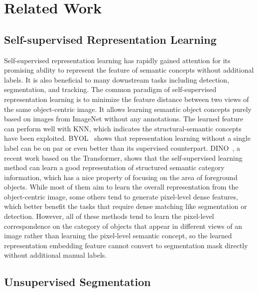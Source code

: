 \documentclass[runningheads]{llncs}
\begin{document}
\section{Related Work}
\label{sec:related_work}

\subsection{Self-supervised Representation Learning}
Self-supervised representation learning has rapidly gained attention for its promising ability to represent the feature of semantic concepts without additional labels. It is also beneficial to many downstream tasks including detection, segmentation, and tracking. The common paradigm of self-supervised representation learning is to minimize the feature distance between two views of the same object-centric image\cite{SwAV,SimSiam,SimCLR,BYOL,MoCoV1,MoCoV2,MoCoV3,EsViT,DINO}. It allows learning semantic object concepts purely based on images from ImageNet without any annotations. The learned feature can perform well with KNN, which indicates the structural-semantic concepts have been exploited. BYOL~\cite{BYOL} shows that representation learning without a single label can be on par or even better than its supervised counterpart. DINO~\cite{DINO}, a recent work based on the Transformer, shows that the self-supervised learning method can learn a good representation of structured semantic category information, which has a nice property of focusing on the area of foreground objects. While most of them aim to learn the overall representation from the object-centric image, some others\cite{DenceCL,PixPro,DSC,VADeR,SetSim,VFS} tend to generate pixel-level dense features, which better benefit the tasks that require dense matching like segmentation or detection. However, all of these methods tend to learn the pixel-level correspondence on the category of objects that appear in different views of an image rather than learning the pixel-level semantic concept, so the learned representation embedding feature cannot convert to segmentation mask directly without additional manual labels.



\subsection{Unsupervised Segmentation}
\end{document}
